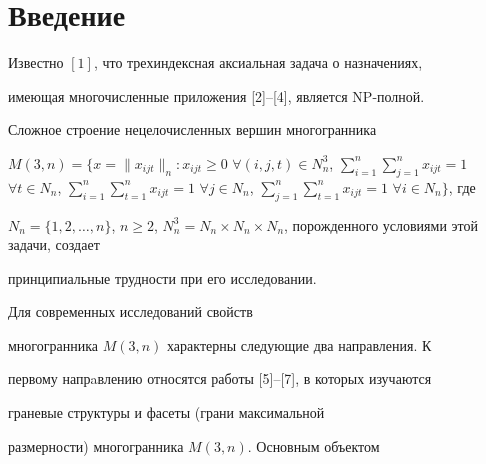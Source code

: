 \pagestyle{plain} %







\maketitle


\label{begin}








\section*{Введение}





Известно $[1]$, что трехиндексная аксиальная задача о назначениях,


имеющая многочисленные приложения [2]--[4], является NP-полной.


Сложное строение нецелочисленных вершин многогранника


$M(3,n)=\Big\{x=\|x_{ijt}\|_n: x_{ijt}


\geq 0$ $\forall (i,j,t)\in N_n^3$, $\sum\limits_{i=1}^n\sum\limits_{j=1}^n


x_{ijt}=1$ $\forall t\in N_n$, $\sum\limits_{i=1}^n\sum\limits_{t=1}^n


x_{ijt}=1$ $\forall j\in N_n$, $\sum\limits_{j=1}^n\sum\limits_{t=1}^n


x_{ijt}=1$ $\forall i\in N_n\Big\}$, где


$N_n=\{1,2,\dotsc,n\}$, $n\geq 2$, $N_n^3 = N_n\times N_n\times


N_n$, порожденного условиями этой задачи, создает


принципиальные трудности при его исследовании.





Для современных исследований свойств


многогранника $M(3,n)$ характерны следующие два направления. К


первому напрaвлению относятся работы [5]--[7], в которых изучаются


граневые структуры и фасеты (грани максимальной


размерности) многогранника $M(3,n)$. Основным объектом


